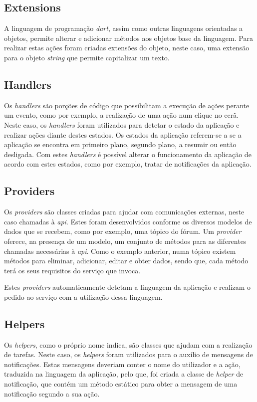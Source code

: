 \subsection{Extensions}
A linguagem de programação \textit{dart}, assim como outras linguagens orientadas a objetos, permite alterar e adicionar métodos aos objetos base da linguagem. Para realizar estas ações foram criadas extensões do objeto, neste caso, uma extensão para o objeto \textit{string} que permite capitalizar um texto.

\subsection{Handlers}
Os \textit{handlers} são porções de código que possibilitam a execução de ações perante um evento, como por exemplo, a realização de uma ação num clique no ecrã. Neste caso, os \textit{handlers} foram utilizados para detetar o estado da aplicação e realizar ações diante destes estados. Os estados da aplicação referem-se a se a aplicação se encontra em primeiro plano, segundo plano, a resumir ou então desligada. Com estes \textit{handlers} é possível alterar o funcionamento da aplicação de acordo com estes estados, como por exemplo, tratar de notificações da aplicação.

\subsection{Providers}
Os \textit{providers} são classes criadas para ajudar com comunicações externas, neste caso chamadas à \textit{\acrshort{api}}. Estes foram desenvolvidos conforme os diversos modelos de dados que se recebem, como por exemplo, uma tópico do fórum. Um \textit{provider} oferece, na presença de um modelo, um conjunto de métodos para as diferentes chamadas necessárias à \textit{\acrshort{api}}. Como o exemplo anterior, numa tópico existem métodos para eliminar, adicionar, editar e obter dados, sendo que, cada método terá os seus requisitos do serviço que invoca.

Estes \textit{providers} automaticamente detetam a linguagem da aplicação e realizam o pedido ao serviço com a utilização dessa linguagem.

\subsection{Helpers}
Os \textit{helpers}, como o próprio nome indica, são classes que ajudam com a realização de tarefas. Neste caso, os \textit{helpers} foram utilizados para o auxílio de mensagens de notificações. Estas mensagens deveriam conter o nome do utilizador e a ação, traduzida na linguagem da aplicação, pelo que, foi criada a classe de \textit{helper} de notificação, que contém um método estático para obter a mensagem de uma notificação segundo a sua ação.